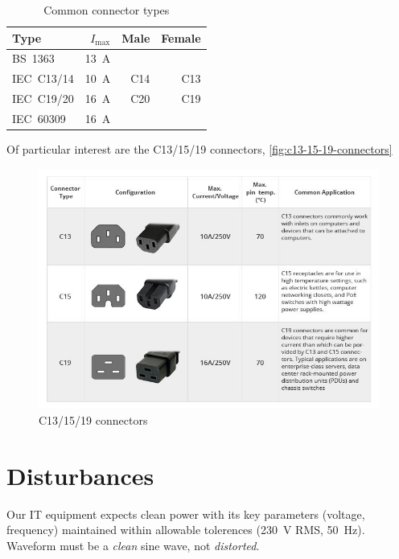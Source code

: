 \documentclass{pgnotes}
\begin{document}
\begin{table}[htbp]
  \centering  
  \begin{tabular}{l r r r}
    \toprule
    \textbf{Type} & $I_{\mbox{max}}$ & \textbf{Male} & \textbf{Female} \\
    \midrule
    BS~1363 & \SI{13}{\ampere} & ~ & ~ \\
    \midrule
    IEC~C13/14 & \SI{10}{\ampere} & C14 & C13 \\
    \midrule  
    IEC~C19/20 & \SI{16}{\ampere} & C20 & C19 \\
    \midrule  
    IEC~60309 & \SI{16}{\ampere} & ~ & ~ \\
    \bottomrule
  \end{tabular}
  \caption{Common connector types}
  \label{tab:common-mains-plugs-sockets}
\end{table}

Of particular interest are the C13/15/19 connectors, \autoref{fig:c13-15-19-connectors}

\begin{figure}[htbp]
  \centering
  \includegraphics[width=0.9\linewidth]{connectors}
  \caption{C13/15/19 connectors}
  \label{fig:c13-15-19-connectors}
\end{figure}

\section{Disturbances}

Our IT equipment expects clean power with its key parameters (voltage, frequency) maintained within allowable tolerences (\SI{230}{\volt} RMS, \SI{50}{\hertz}).
Waveform must be a \textit{clean} sine wave, not \textit{distorted}.
\end{document}
